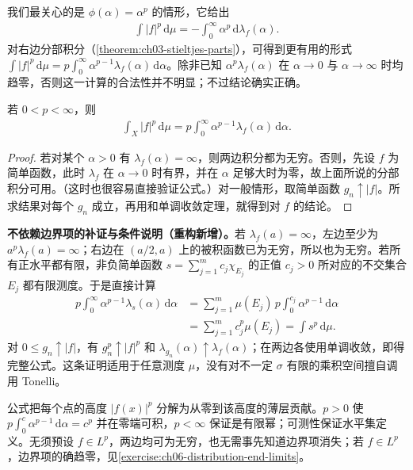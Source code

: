 \documentclass[../../main.tex]{subfiles}
\begin{document}
我们最关心的是 $\phi(\alpha)=\alpha^p$ 的情形，它给出
\begin{align*}
\int|f|^p\,\mathrm d\mu=-\int_0^\infty\alpha^p\,\mathrm d\lambda_f(\alpha).
\end{align*}
对右边分部积分（\cref{theorem:ch03-stieltjes-parts}），可得到更有用的形式 $\int|f|^p\,\mathrm d\mu=p\int_0^\infty\alpha^{p-1}\lambda_f(\alpha)\,\mathrm d\alpha$。除非已知 $\alpha^p\lambda_f(\alpha)$ 在 $\alpha\to0$ 与 $\alpha\to\infty$ 时均趋零，否则这一计算的合法性并不明显；不过结论确实正确。
\begin{proposition}\label{proposition:ch06-layer-cake}
若 $0<p<\infty$，则
\begin{align*}
\int_X|f|^p\,\mathrm d\mu=p\int_0^\infty\alpha^{p-1}\lambda_f(\alpha)\,\mathrm d\alpha.
\end{align*}
\end{proposition}
\begin{proof}
若对某个 $\alpha>0$ 有 $\lambda_f(\alpha)=\infty$，则两边积分都为无穷。否则，先设 $f$ 为简单函数，此时 $\lambda_f$ 在 $\alpha\to0$ 时有界，并在 $\alpha$ 足够大时为零，故上面所说的分部积分可用。（这时也很容易直接验证公式。）对一般情形，取简单函数 $g_n\uparrow|f|$。所求结果对每个 $g_n$ 成立，再用和单调收敛定理，就得到对 $f$ 的结论。
\end{proof}
\begin{remark}
\textbf{不依赖边界项的补证与条件说明（重构新增）。}若 $\lambda_f(a)=\infty$，左边至少为 $a^p\lambda_f(a)=\infty$；右边在 $(a/2,a)$ 上的被积函数已为无穷，所以也为无穷。若所有正水平都有限，非负简单函数 $s=\sum_{j=1}^m c_j\chi_{E_j}$ 的正值 $c_j>0$ 所对应的不交集合 $E_j$ 都有限测度。于是直接计算
\begin{align*}
p\int_0^\infty\alpha^{p-1}\lambda_s(\alpha)\,\mathrm d\alpha
&=\sum_{j=1}^m\mu(E_j)\,p\int_0^{c_j}\alpha^{p-1}\,\mathrm d\alpha\\
&=\sum_{j=1}^m c_j^p\mu(E_j)=\int s^p\,\mathrm d\mu.
\end{align*}
对 $0\leqslant g_n\uparrow|f|$，有 $g_n^p\uparrow|f|^p$ 和 $\lambda_{g_n}(\alpha)\uparrow\lambda_f(\alpha)$；在两边各使用单调收敛，即得完整公式。这条证明适用于任意测度 $\mu$，没有对不一定 $\sigma$ 有限的乘积空间擅自调用 Tonelli。

公式把每个点的高度 $|f(x)|^p$ 分解为从零到该高度的薄层贡献。$p>0$ 使 $p\int_0^c\alpha^{p-1}\,\mathrm d\alpha=c^p$ 并在零端可积，$p<\infty$ 保证是有限幂；可测性保证水平集定义。无须预设 $f\in L^p$，两边均可为无穷，也无需事先知道边界项消失；若 $f\in L^p$，边界项的确趋零，见\cref{exercise:ch06-distribution-end-limits}。
\end{remark}
\end{document}
